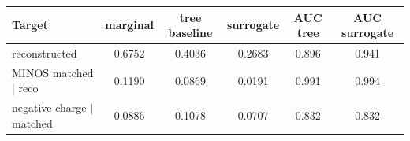 \begin{tabular}{lccccc}
\toprule
Target & marginal & tree baseline & surrogate & AUC tree & AUC surrogate \\
\midrule
reconstructed & 0.6752 & 0.4036 & 0.2683 & 0.896 & 0.941 \\
MINOS matched $\mid$ reco & 0.1190 & 0.0869 & 0.0191 & 0.991 & 0.994 \\
negative charge $\mid$ matched & 0.0886 & 0.1078 & 0.0707 & 0.832 & 0.832 \\
\bottomrule
\end{tabular}
